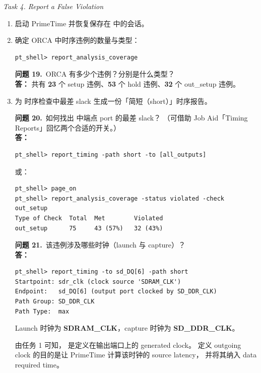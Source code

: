 \noindent\textit{Task 4. Report a False Violation}

\begin{enumerate}
  \item 启动 PrimeTime 并恢复保存在  中的会话。

  \item 确定 ORCA 中时序违例的数量与类型：
\begin{lstlisting}
pt_shell> report_analysis_coverage
\end{lstlisting}

\begin{questionBox}
\textbf{问题 19.}\ ORCA 有多少个违例？分别是什么类型？\\[0.35em]
\textbf{答：} 共有 \textbf{23} 个 setup 违例、\textbf{53} 个 hold 违例、\textbf{32} 个 out\_setup 违例。
\end{questionBox}

  \item 为  时序检查中最差 slack 生成一份「简短（short）」时序报告。

\begin{questionBox}
\textbf{问题 20.}\ 如何找出  中端点 port 的最差 slack？
（可借助 Job Aid「Timing Reports」回忆两个合适的开关。）\\[0.35em]
\textbf{答：}\\
\begin{lstlisting}
pt_shell> report_timing -path short -to [all_outputs]
\end{lstlisting}
或：
\begin{lstlisting}
pt_shell> page_on
pt_shell> report_analysis_coverage -status violated -check out_setup
Type of Check  Total  Met        Violated
out_setup      75     43 (57%)   32 (43%)
\end{lstlisting}

\textbf{问题 21.}\ 该违例涉及哪些时钟（launch 与 capture）？\\[0.35em]
\textbf{答：}\\
\begin{lstlisting}
pt_shell> report_timing -to sd_DQ[6] -path short
Startpoint: sdr_clk (clock source 'SDRAM_CLK')
Endpoint:   sd_DQ[6] (output port clocked by SD_DDR_CLK)
Path Group: SD_DDR_CLK
Path Type:  max
\end{lstlisting}
Launch 时钟为 \textbf{SDRAM\_CLK}，capture 时钟为 \textbf{SD\_DDR\_CLK}。
\end{questionBox}

\begin{noteBox}
由任务 1 可知， 是定义在输出端口上的 generated clock。
定义 outgoing clock 的目的是让 PrimeTime 计算该时钟的 source latency，
并将其纳入 data required time。
\end{noteBox}


\end{enumerate}
